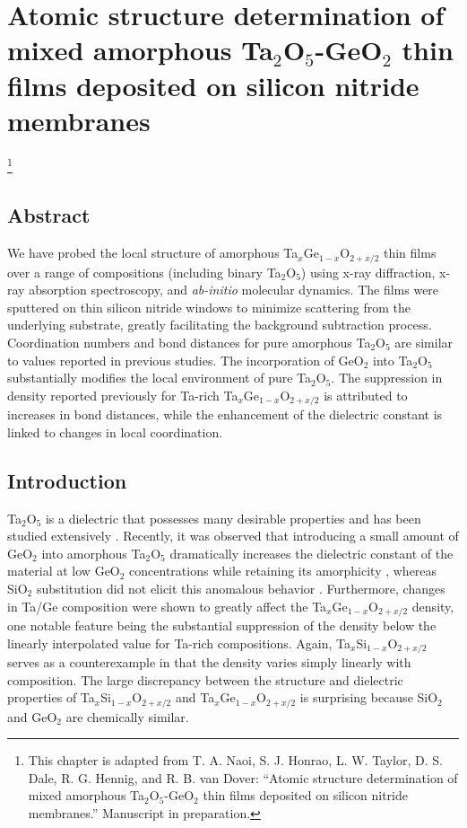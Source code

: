 \chapter{Atomic structure determination of mixed amorphous Ta$_{2}$O$_{5}$-GeO$_{2}$ thin films deposited on silicon nitride membranes}

{\let\thefootnote\relax\footnote{{
This chapter is adapted from T. A. Naoi, S. J. Honrao, L. W. Taylor, D. S. Dale, R. G. Hennig, and R. B. van Dover: ``Atomic structure determination of mixed amorphous Ta$_{2}$O$_{5}$-GeO$_{2}$ thin films deposited on silicon nitride membranes.'' Manuscript in preparation.
}}}

\section{Abstract}
We have probed the local structure of amorphous Ta$_{x}$Ge$_{1-x}$O$_{2+x/2}$ thin films over a range of compositions (including binary Ta$_{2}$O$_{5}$) using x-ray diffraction, x-ray absorption spectroscopy, and \emph{ab-initio} molecular dynamics. The films were sputtered on thin silicon nitride windows to minimize scattering from the underlying substrate, greatly facilitating the background subtraction process. Coordination numbers and bond distances for pure amorphous Ta$_{2}$O$_{5}$ are similar to values reported in previous studies. The incorporation of GeO$_{2}$ into Ta$_{2}$O$_{5}$ substantially modifies the local environment of pure Ta$_{2}$O$_{5}$. The suppression in density reported previously for Ta-rich Ta$_{x}$Ge$_{1-x}$O$_{2+x/2}$ is attributed to increases in bond distances, while the enhancement of the dielectric constant is linked to changes in local coordination.
    
\section{Introduction}
Ta$_{2}$O$_{5}$ is a dielectric that possesses many desirable properties and has been studied extensively \cite{Chaneliere1998}. Recently, it was observed that introducing a small amount of GeO$_{2}$ into amorphous Ta$_{2}$O$_{5}$ dramatically increases the dielectric constant of the material at low GeO$_{2}$ concentrations while retaining its amorphicity \cite{Naoi2012}, whereas SiO$_{2}$ substitution did not elicit this anomalous behavior \cite{Naoi2018jap}. Furthermore, changes in Ta/Ge composition were shown to greatly affect the Ta$_{x}$Ge$_{1-x}$O$_{2+x/2}$ density, one notable feature being the substantial suppression of the density below the linearly interpolated value for Ta-rich compositions. Again, Ta$_{x}$Si$_{1-x}$O$_{2+x/2}$ serves as a counterexample in that the density varies simply linearly with composition. The large discrepancy between the structure and dielectric properties of Ta$_{x}$Si$_{1-x}$O$_{2+x/2}$ and Ta$_{x}$Ge$_{1-x}$O$_{2+x/2}$ is surprising because SiO$_{2}$ and GeO$_{2}$ are chemically similar.

